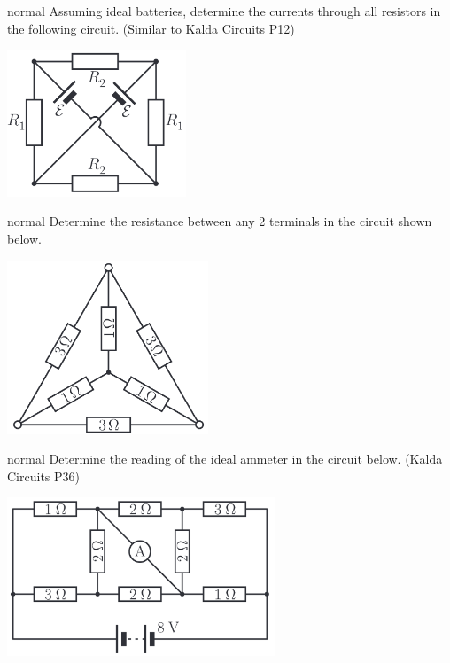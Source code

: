 \hypertarget{P25}{}
\begin{solution}{normal} %
Assuming ideal batteries, determine the currents through all resistors in the following circuit. (Similar to Kalda Circuits P12)
\begin{center}
    \includegraphics[width=0.4\textwidth]{S1 Figures/S1-25.png}
\end{center}
\end{solution}

\hypertarget{P26}{}
\begin{solution}{normal} %
Determine the resistance between any 2 terminals in the circuit shown below.
\begin{center}
    \includegraphics[width=0.45\textwidth]{S1 Figures/S1-26.png}
\end{center}
\end{solution}

\hypertarget{P27}{}
\begin{solution}{normal} %
Determine the reading of the ideal ammeter in the circuit below. (Kalda Circuits P36)
\begin{center}
    \includegraphics[width=0.6\textwidth]{S1 Figures/S1-27.png}
\end{center}
\end{solution}

